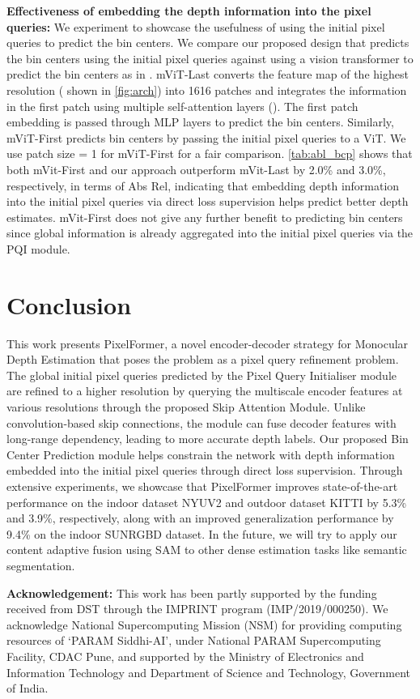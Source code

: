 \documentclass[10pt,twocolumn,letterpaper]{article}
\newcommand{\myfirstpara}[1]{\par \noindent \textbf{#1:}}
\newcommand{\mypara}[1]{\vspace{0.5em} \myfirstpara{#1}}
\begin{document}
                
 
\mypara{Effectiveness of embedding the depth information into the pixel queries}
We experiment to showcase the usefulness of using the initial pixel queries to predict the bin centers. We compare our proposed design that predicts the bin centers using the initial pixel queries against using a vision transformer to predict the bin centers as in \cite{adabins}. mViT-Last converts the feature map of the highest resolution ( shown in \cref{fig:arch}) into 1616 patches and integrates the information in the first patch using multiple self-attention layers (). The first patch embedding is passed through MLP layers to predict the bin centers. Similarly, mViT-First predicts bin centers by passing the initial pixel queries to a ViT. We use patch size = 1 for mViT-First for a fair comparison. \cref{tab:abl_bcp} shows that both mVit-First and our approach outperform mVit-Last by 2.0\% and 3.0\%, respectively, in terms of Abs Rel, indicating that embedding depth information into the initial pixel queries via direct loss supervision helps predict better depth estimates. mVit-First does not give any further benefit to predicting bin centers since global information is already aggregated into the initial pixel queries via the PQI module.

 
\section{Conclusion}
This work presents PixelFormer, a novel encoder-decoder strategy for Monocular Depth Estimation that poses the problem as a pixel query refinement problem. The global initial pixel queries predicted by the Pixel Query Initialiser module are refined to a higher resolution by querying the multiscale encoder features at various resolutions through the proposed Skip Attention Module. Unlike convolution-based skip connections, the module can fuse decoder features with long-range dependency, leading to more accurate depth labels. Our proposed Bin Center Prediction module helps constrain the network with depth information embedded into the initial pixel queries through direct loss supervision. Through extensive experiments, we showcase that PixelFormer improves state-of-the-art performance on the indoor dataset NYUV2 and outdoor dataset KITTI by 5.3\% and 3.9\%, respectively, along with an improved generalization performance by 9.4\% on the indoor SUNRGBD dataset. In the future, we will try to apply our content adaptive fusion using SAM to other dense estimation tasks like semantic segmentation.

\mypara{Acknowledgement} This work has been partly supported by the funding received from DST through the IMPRINT program (IMP/2019/000250). We acknowledge National Supercomputing Mission (NSM) for providing computing resources of `PARAM Siddhi-AI', under National PARAM Supercomputing Facility, CDAC Pune, and supported by the Ministry of Electronics and Information Technology and Department of Science and Technology, Government of India. 


 
{\small


}
\end{document}
